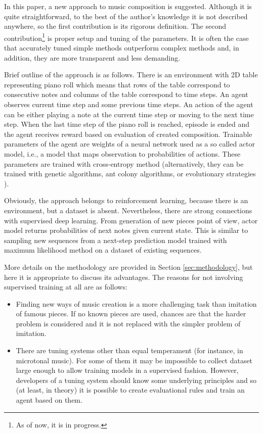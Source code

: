 \documentclass{article}
\begin{document}
In this paper, a new approach to music composition is suggested. Although it is quite straightforward, to the best of the author's knowledge it is not described anywhere, so the first contribution is its rigorous definition. The second contribution\footnote{As of now, it is in progress.} is proper setup and tuning of the parameters. It is often the case that accurately tuned simple methods outperform complex methods \cite{dacrema2019are} and, in addition, they are more transparent and less demanding.

Brief outline of the approach is as follows. There is an environment with 2D table representing piano roll which means that rows of the table correspond to consecutive notes and columns of the table correspond to time steps. An agent observes current time step and some previous time steps. An action of the agent can be either playing a note at the current time step or moving to the next time step. When the last time step of the piano roll is reached, episode is ended and the agent receives reward based on evaluation of created composition. Trainable parameters of the agent are weights of a neural network used as a so called actor model, i.e., a model that maps observation to probabilities of actions. These parameters are trained with cross-entropy method (alternatively, they can be trained with genetic algorithms, ant colony algorithms, or evolutionary strategies \cite{salimans2017evolution}).

Obviously, the approach belongs to reinforcement learning, because there is an environment, but a dataset is absent. Nevertheless, there are strong connections with supervised deep learning. From generation of new pieces point of view, actor model returns probabilities of next notes given current state. This is similar to sampling new sequences from a next-step prediction model trained with maximum likelihood method on a dataset of existing sequences.

More details on the methodology are provided in Section \ref{sec:methodology}, but here it is appropriate to discuss its advantages. The reasons for not involving supervised training at all are as follows:
\begin{itemize}
	\item Finding new ways of music creation is a more challenging task than imitation of famous pieces. If no known pieces are used, chances are that the harder problem is considered and it is not replaced with the simpler problem of imitation.
	\item There are tuning systems other than equal temperament (for instance, in microtonal music). For some of them it may be impossible to collect dataset large enough to allow training models in a supervised fashion. However, developers of a tuning system should know some underlying principles and so (at least, in theory) it is possible to create evaluational rules and train an agent based on them.
\end{itemize}
\end{document}
